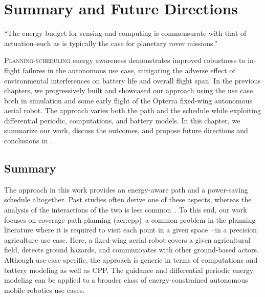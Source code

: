 
%
%
%
\chapter{Summary and Future Directions}
\label{cp:conc}

\begin{chapquote}{\cite{ondruska2015scheduled}}
  ``The energy budget for sensing and computing is commensurate with  that of actuation--such as is typically the case for planetary rover missions.''
\end{chapquote}
  
\vspace*{1em}



\lettrine{P}{lanning-scheduling} energy awareness demonstrates improved robustness to in-flight failures in the autonomous use case, mitigating the adverse effect of environmental interferences on battery life and overall flight span. In the previous chapters, we progressively built and showcased our approach using the use case both in simulation and some early flight of the Opterra fixed-wing autonomous aerial robot. The approach varies both the path and the schedule while exploiting differential periodic, computations, and battery models. In this chapter, we summarize our work, discuss the outcomes, and propose future directions and conclusions in .


\section{Summary}
\label{sec:conc-summ}

The approach in this work provides an energy-aware path and a power-saving schedule altogether. Past studies often derive one of these aspects, whereas the analysis of the interactions of the two is less common~\citep{brateman2006energy,sudhakar2020balancing}. To this end, our work focuses on coverage path planning (\Gls{acr:cpp})--a common problem in the planning literature where it is required to visit each point in a given space~\citep{choset2001coverage,galceran2013survey}--in a precision agriculture use case. Here, a fixed-wing aerial robot covers a given agricultural field, detects ground hazards, and communicates with other ground-based actors. Although use-case specific, the approach is generic in terms of computations and battery modeling as well as CPP. The guidance and differential periodic energy modeling can be applied to a broader class of energy-constrained autonomous mobile robotics use cases.

